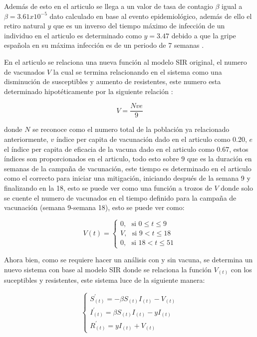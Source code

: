 Además de esto en el articulo se llega a un valor de tasa de contagio $\beta$ igual a $\beta = 3.61x10^{-5}$ dato calculado en base al evento epidemiológico, además de ello el retiro natural $y$ que es un inverso del tiempo máximo de infección de un individuo en el articulo es determinado como $y = 3.47$ debido a que la gripe española en su máxima infección es de un periodo de 7 semanas \cite{articulo-sir}.

 En el articulo se relaciona una nueva función al modelo SIR original, el numero de vacunados \textbf{$V$} la cual se termina relacionando en el sistema como una disminución de susceptibles y aumento de resistentes, este numero esta determinado hipotéticamente por la siguiente relación \cite{articulo-sir}:

\begin{equation}
\label{vacunados}
        V = \frac{Nve}{9}
\end{equation}

donde $N$ se reconoce como el numero total de la población ya relacionado anteriormente, $v$ índice per capita de vacunación dado en el articulo como 0.20, $e$ el índice per capita de eficacia de la vacuna dado en el articulo como 0.67, estos índices son proporcionados en el articulo, todo esto sobre $9$ que es la duración en semanas de la campaña de vacunación, este tiempo es determinado en el articulo como el correcto para iniciar una mitigación, iniciando después de la semana 9 y finalizando en la 18, esto se puede ver como una función a trozos de $V$ donde solo se cuente el numero de vacunados en el tiempo definido para la campaña de vacunación (semana 9-semana 18), esto se puede ver como:

\begin{equation}
\label{funcion_trozos_vacunados}
V(t) = 
\left\{
    \begin{array}{lr}
        0,\text{ }\text{si } 0\leq t\leq9\\
        V,\text{ }\text{si } 9<t\leq 18\\
        0,\text{ }\text{si } 18<t\leq51
    \end{array}
\right.
\end{equation}

Ahora bien, como se requiere hacer un análisis con y sin vacuna, se determina un nuevo sistema con base al modelo SIR donde se relaciona la función $V_{(t)}$ con los suceptibles y resistentes, este sistema luce de la siguiente manera:

\begin{equation}
\label{sistema_vacuna} 
\left\{
    \begin{array}{lr}
        S^\prime_{(t)} = -\beta S_{(t)} I_{(t)} - V_{(t)}\\
        I^\prime_{(t)} = \beta S_{(t)} I_{(t)} - yI_{(t)}\\
        R^\prime_{(t)} = yI_{(t)} + V_{(t)}
    \end{array}
\right.
\end{equation}


